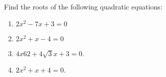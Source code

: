 Find the roots of the following quadratic equations:

\begin{enumerate}
\item $ 2x^2 - 7x + 3 = 0$
\item $ 2x^2 + x - 4 = 0 $
\item $ 4x62 + 4\sqrt{3}x + 3 = 0 $.
\item $ 2x^2 + x + 4 = 0 $.
\end{enumerate}